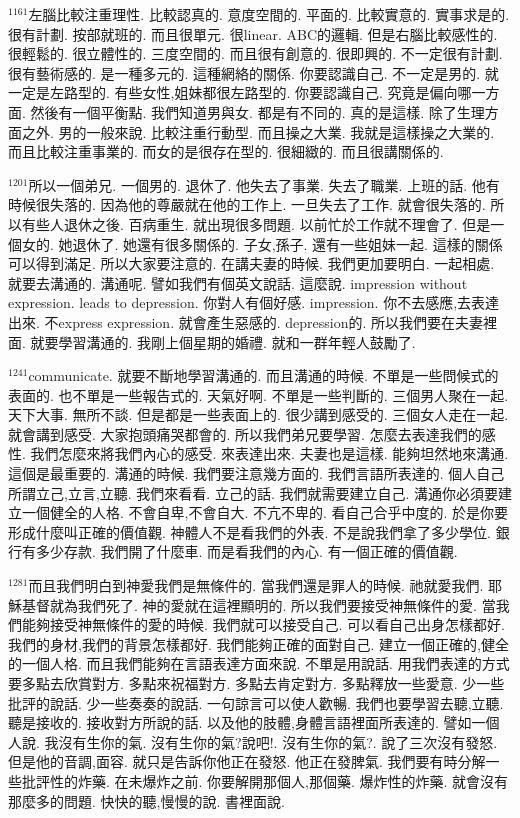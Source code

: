 \documentclass{book}
\begin{document}
$^{1161}$左腦比較注重理性.
比較認真的.
意度空間的.
平面的.
比較實意的.
實事求是的.
很有計劃.
按部就班的.
而且很單元.
很linear.
ABC的邏輯.
但是右腦比較感性的.
很輕鬆的.
很立體性的.
三度空間的.
而且很有創意的.
很即興的.
不一定很有計劃.
很有藝術感的.
是一種多元的.
這種網絡的關係.
你要認識自己.
不一定是男的.
就一定是左路型的.
有些女性,姐妹都很左路型的.
你要認識自己.
究竟是偏向哪一方面.
然後有一個平衡點.
我們知道男與女.
都是有不同的.
真的是這樣.
除了生理方面之外.
男的一般來說.
比較注重行動型.
而且操之大業.
我就是這樣操之大業的.
而且比較注重事業的.
而女的是很存在型的.
很細緻的.
而且很講關係的.

$^{1201}$所以一個弟兄.
一個男的.
退休了.
他失去了事業.
失去了職業.
上班的話.
他有時候很失落的.
因為他的尊嚴就在他的工作上.
一旦失去了工作.
就會很失落的.
所以有些人退休之後.
百病重生.
就出現很多問題.
以前忙於工作就不理會了.
但是一個女的.
她退休了.
她還有很多關係的.
子女,孫子.
還有一些姐妹一起.
這樣的關係可以得到滿足.
所以大家要注意的.
在講夫妻的時候.
我們更加要明白.
一起相處.
就要去溝通的.
溝通呢.
譬如我們有個英文說話.
這麼說.
impression without expression.
leads to depression.
你對人有個好感.
impression.
你不去感應,去表達出來.
不express expression.
就會產生惡感的.
depression的.
所以我們要在夫妻裡面.
就要學習溝通的.
我剛上個星期的婚禮.
就和一群年輕人鼓勵了.

$^{1241}$communicate.
就要不斷地學習溝通的.
而且溝通的時候.
不單是一些問候式的表面的.
也不單是一些報告式的.
天氣好啊.
不單是一些判斷的.
三個男人聚在一起.
天下大事.
無所不談.
但是都是一些表面上的.
很少講到感受的.
三個女人走在一起.
就會講到感受.
大家抱頭痛哭都會的.
所以我們弟兄要學習.
怎麼去表達我們的感性.
我們怎麼來將我們內心的感受.
來表達出來.
夫妻也是這樣.
能夠坦然地來溝通.
這個是最重要的.
溝通的時候.
我們要注意幾方面的.
我們言語所表達的.
個人自己所謂立己,立言,立聽.
我們來看看.
立己的話.
我們就需要建立自己.
溝通你必須要建立一個健全的人格.
不會自卑,不會自大.
不亢不卑的.
看自己合乎中度的.
於是你要形成什麼叫正確的價值觀.
神體人不是看我們的外表.
不是說我們拿了多少學位.
銀行有多少存款.
我們開了什麼車.
而是看我們的內心.
有一個正確的價值觀.

$^{1281}$而且我們明白到神愛我們是無條件的.
當我們還是罪人的時候.
祂就愛我們.
耶穌基督就為我們死了.
神的愛就在這裡顯明的.
所以我們要接受神無條件的愛.
當我們能夠接受神無條件的愛的時候.
我們就可以接受自己.
可以看自己出身怎樣都好.
我們的身材,我們的背景怎樣都好.
我們能夠正確的面對自己.
建立一個正確的,健全的一個人格.
而且我們能夠在言語表達方面來說.
不單是用說話.
用我們表達的方式要多點去欣賞對方.
多點來祝福對方.
多點去肯定對方.
多點釋放一些愛意.
少一些批評的說話.
少一些奏奏的說話.
一句諒言可以使人歡暢.
我們也要學習去聽,立聽.
聽是接收的.
接收對方所說的話.
以及他的肢體,身體言語裡面所表達的.
譬如一個人說.
我沒有生你的氣.
沒有生你的氣?說吧!.
沒有生你的氣?.
說了三次沒有發怒.
但是他的音調,面容.
就只是告訴你他正在發怒.
他正在發脾氣.
我們要有時分解一些批評性的炸藥.
在未爆炸之前.
你要解開那個人,那個藥.
爆炸性的炸藥.
就會沒有那麼多的問題.
快快的聽,慢慢的說.
書裡面說.
\end{document}
